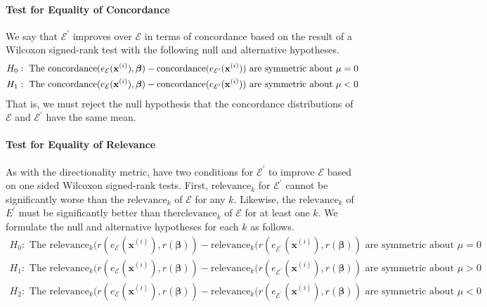 \documentclass[mnsc,blindrev]{informs3}
\newcommand{\mE}{\mathcal{E}}
\begin{document}
            \paragraph{Test for Equality of Concordance}  
            We say that $\mE^\prime$ improves over $\mE$ in terms of concordance based on the result of a Wilcoxon signed-rank test with the following null and alternative hypotheses.
            \begin{align*}
                H_0: \text{ The } \text{\text{concordance}}(e_\mE(\mathbf{x}^{(i)}),\boldsymbol{\beta}) - \text{\text{concordance}}(e_{\mE^\prime}(\mathbf{x}^{(i)})) \text{ are symmetric about } \mu=0 \\
                H_1: \text{ The } \text{\text{concordance}}(e_\mE(\mathbf{x}^{(i)}),\boldsymbol{\beta}) - \text{\text{concordance}}(e_{\mE^\prime}(\mathbf{x}^{(i)})) \text{ are symmetric about } \mu<0     \end{align*}
            That is, we must reject the null hypothesis that the concordance distributions of $\mE$ and $\mE^\prime$ have the same mean.        
            \paragraph{Test for Equality of Relevance}         As with the directionality metric, have two conditions for $\mE^\prime$ to improve $\mE$ based on one sided Wilcoxon signed-rank tests. First, $\text{relevance}_k$ for $\mE^\prime$ cannot be significantly worse than the $\text{relevance}_k$ of $\mE$ for any $k$. Likewise, the $\text{relevance}_k$ of $E^\prime$ must be significantly better than the$\text{relevance}_k$ of $\mE$ for at least one $k$. We formulate the null and alternative hypotheses for each $k$ as follows.
            \begin{align*}
            H_0: \text{ The } \text{relevance}_k(r(e_\mE(\mathbf{x}^{(i)}), r(\boldsymbol{\beta})) - \text{relevance}_k(r(e_{\mE^\prime}(\mathbf{x}^{(i)}), r(\boldsymbol{\beta})) \text{ are symmetric about } \mu=0 \\
            H_1: \text{ The }\text{relevance}_k(r(e_\mE(\mathbf{x}^{(i)}), r(\boldsymbol{\beta})) - \text{relevance}_k(r(e_{\mE^\prime}(\mathbf{x}^{(i)}), r(\boldsymbol{\beta})) \text{ are symmetric about } \mu > 0 \\
            H_2: \text{ The } \text{relevance}_k(r(e_\mE(\mathbf{x}^{(i)}), r(\boldsymbol{\beta})) - \text{relevance}_k(r(e_{\mE^\prime}(\mathbf{x}^{(i)}), r(\boldsymbol{\beta})) \text{ are symmetric about } \mu<0      \end{align*}
\end{document}
